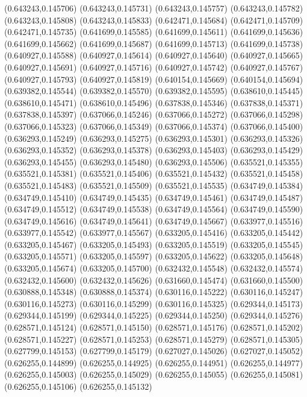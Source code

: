(0.643243,0.145706)
(0.643243,0.145731)
(0.643243,0.145757)
(0.643243,0.145782)
(0.643243,0.145808)
(0.643243,0.145833)
(0.642471,0.145684)
(0.642471,0.145709)
(0.642471,0.145735)
(0.641699,0.145585)
(0.641699,0.145611)
(0.641699,0.145636)
(0.641699,0.145662)
(0.641699,0.145687)
(0.641699,0.145713)
(0.641699,0.145738)
(0.640927,0.145588)
(0.640927,0.145614)
(0.640927,0.145640)
(0.640927,0.145665)
(0.640927,0.145691)
(0.640927,0.145716)
(0.640927,0.145742)
(0.640927,0.145767)
(0.640927,0.145793)
(0.640927,0.145819)
(0.640154,0.145669)
(0.640154,0.145694)
(0.639382,0.145544)
(0.639382,0.145570)
(0.639382,0.145595)
(0.638610,0.145445)
(0.638610,0.145471)
(0.638610,0.145496)
(0.637838,0.145346)
(0.637838,0.145371)
(0.637838,0.145397)
(0.637066,0.145246)
(0.637066,0.145272)
(0.637066,0.145298)
(0.637066,0.145323)
(0.637066,0.145349)
(0.637066,0.145374)
(0.637066,0.145400)
(0.636293,0.145249)
(0.636293,0.145275)
(0.636293,0.145301)
(0.636293,0.145326)
(0.636293,0.145352)
(0.636293,0.145378)
(0.636293,0.145403)
(0.636293,0.145429)
(0.636293,0.145455)
(0.636293,0.145480)
(0.636293,0.145506)
(0.635521,0.145355)
(0.635521,0.145381)
(0.635521,0.145406)
(0.635521,0.145432)
(0.635521,0.145458)
(0.635521,0.145483)
(0.635521,0.145509)
(0.635521,0.145535)
(0.634749,0.145384)
(0.634749,0.145410)
(0.634749,0.145435)
(0.634749,0.145461)
(0.634749,0.145487)
(0.634749,0.145512)
(0.634749,0.145538)
(0.634749,0.145564)
(0.634749,0.145590)
(0.634749,0.145616)
(0.634749,0.145641)
(0.634749,0.145667)
(0.633977,0.145516)
(0.633977,0.145542)
(0.633977,0.145567)
(0.633205,0.145416)
(0.633205,0.145442)
(0.633205,0.145467)
(0.633205,0.145493)
(0.633205,0.145519)
(0.633205,0.145545)
(0.633205,0.145571)
(0.633205,0.145597)
(0.633205,0.145622)
(0.633205,0.145648)
(0.633205,0.145674)
(0.633205,0.145700)
(0.632432,0.145548)
(0.632432,0.145574)
(0.632432,0.145600)
(0.632432,0.145626)
(0.631660,0.145474)
(0.631660,0.145500)
(0.630888,0.145348)
(0.630888,0.145374)
(0.630116,0.145222)
(0.630116,0.145247)
(0.630116,0.145273)
(0.630116,0.145299)
(0.630116,0.145325)
(0.629344,0.145173)
(0.629344,0.145199)
(0.629344,0.145225)
(0.629344,0.145250)
(0.629344,0.145276)
(0.628571,0.145124)
(0.628571,0.145150)
(0.628571,0.145176)
(0.628571,0.145202)
(0.628571,0.145227)
(0.628571,0.145253)
(0.628571,0.145279)
(0.628571,0.145305)
(0.627799,0.145153)
(0.627799,0.145179)
(0.627027,0.145026)
(0.627027,0.145052)
(0.626255,0.144899)
(0.626255,0.144925)
(0.626255,0.144951)
(0.626255,0.144977)
(0.626255,0.145003)
(0.626255,0.145029)
(0.626255,0.145055)
(0.626255,0.145081)
(0.626255,0.145106)
(0.626255,0.145132)
